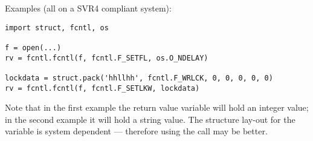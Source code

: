 Examples (all on a SVR4 compliant system):

\begin{verbatim}
import struct, fcntl, os

f = open(...)
rv = fcntl.fcntl(f, fcntl.F_SETFL, os.O_NDELAY)

lockdata = struct.pack('hhllhh', fcntl.F_WRLCK, 0, 0, 0, 0, 0)
rv = fcntl.fcntl(f, fcntl.F_SETLKW, lockdata)
\end{verbatim}

Note that in the first example the return value variable  will
hold an integer value; in the second example it will hold a string
value.  The structure lay-out for the  variable is
system dependent --- therefore using the  call may be
better.

\begin{seealso}
\end{seealso}
